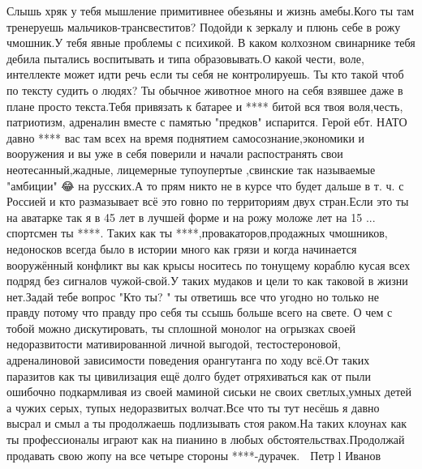  
 
 
 
 

Слышь хряк у тебя мышление примитивнее обезьяны и жизнь амебы.Кого ты там
тренеруешь мальчиков-трансвеститов? Подойди к зеркалу и плюнь себе в рожу
чмошник.У тебя явные проблемы с психикой. В каком колхозном свинарнике тебя
дебила пытались воспитывать и типа образовывать.О какой чести, воле, интеллекте
может идти речь если ты себя не контролируешь. Ты кто такой чтоб по тексту
судить о людях? Ты обычное животное много на себя взявшее даже в плане просто
текста.Тебя привязать к батарее и **** битой вся твоя воля,честь, патриотизм,
адреналин вместе с памятью "предков" испарится. Герой ебт. НАТО давно **** вас
там всех на время поднятием самосознание,экономики и вооружения и вы уже в себя
поверили и начали распостранять свои неотесанный,жадные, лицемерные тупоупертые
,свинские так называемые "амбиции" 😂 на русских.А то прям никто не в курсе что
будет дальше в т. ч. с Россией и кто размазывает всё это говно по территориям
двух стран.Если это ты на аватарке так я в 45 лет в лучшей форме и на рожу
моложе лет на 15 ... спортсмен ты ****. Таких как ты
****,провакаторов,продажных чмошников, недоносков всегда было в истории много
как грязи и когда начинается вооружённый конфликт вы как крысы носитесь по
тонущему кораблю кусая всех подряд без сигналов чужой-свой.У таких мудаков и
цели то как таковой в жизни нет.Задай тебе вопрос "Кто ты? " ты ответишь все
что угодно но только не правду потому что правду про себя ты ссышь больше всего
на свете. О чем с тобой можно дискутировать, ты сплошной монолог на огрызках
своей недоразвитости мативированной личной выгодой, тестостероновой,
адреналиновой зависимости поведения орангутанга по ходу всё.От таких паразитов
как ты цивилизация ещё долго будет отряхиваться как от пыли ошибочно
подкармливая из своей маминой сиськи не своих светлых,умных детей а чужих
серых, тупых недоразвитых волчат.Все что ты тут несёшь я давно высрал и смыл а
ты продолжаешь подлизывать стоя раком.На таких клоунах как ты профессионалы
играют как на пианино в любых обстоятельствах.Продолжай продавать свою жопу на
все четыре стороны ****-дурачек. 🖕  Петр l  Иванов

